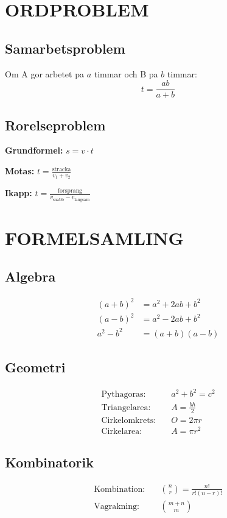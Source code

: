 \documentclass[11pt,a4paper]{article}
\begin{document}
\section{ORDPROBLEM}

\subsection{Samarbetsproblem}

\begin{tcolorbox}[title=Formel: Tva arbetare]
Om A gor arbetet pa $a$ timmar och B pa $b$ timmar:
\[ t = \frac{ab}{a+b} \]
\end{tcolorbox}

\subsection{Rorelseproblem}

\textbf{Grundformel:} $s = v \cdot t$

\textbf{Motas:} $t = \frac{\text{stracka}}{v_1 + v_2}$

\textbf{Ikapp:} $t = \frac{\text{forsprang}}{v_{\text{snabb}} - v_{\text{langsam}}}$

\section{FORMELSAMLING}

\subsection{Algebra}
\begin{align*}
(a+b)^2 &= a^2 + 2ab + b^2 \\
(a-b)^2 &= a^2 - 2ab + b^2 \\
a^2 - b^2 &= (a+b)(a-b)
\end{align*}

\subsection{Geometri}
\begin{align*}
\text{Pythagoras:} \quad & a^2 + b^2 = c^2 \\
\text{Triangelarea:} \quad & A = \frac{bh}{2} \\
\text{Cirkelomkrets:} \quad & O = 2\pi r \\
\text{Cirkelarea:} \quad & A = \pi r^2
\end{align*}

\subsection{Kombinatorik}
\begin{align*}
\text{Kombination:} \quad & \binom{n}{r} = \frac{n!}{r!(n-r)!} \\
\text{Vagrakning:} \quad & \binom{m+n}{m}
\end{align*}
\end{document}
